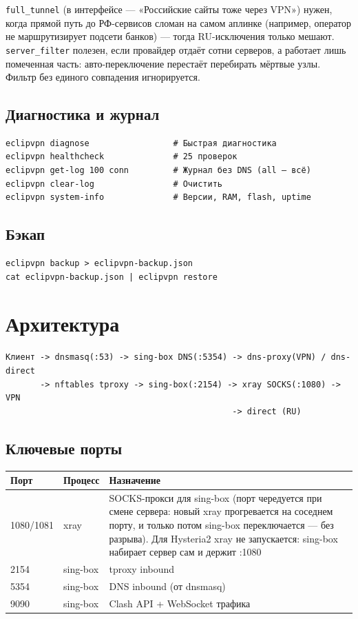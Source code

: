 \documentclass[11pt,a4paper]{article}
\begin{document}
\texttt{full\_tunnel} (в интерфейсе --- «Российские сайты тоже через VPN») нужен, когда прямой путь до РФ-сервисов сломан на самом аплинке (например, оператор не маршрутизирует подсети банков) --- тогда RU-исключения только мешают. \texttt{server\_filter} полезен, если провайдер отдаёт сотни серверов, а работает лишь помеченная часть: авто-переключение перестаёт перебирать мёртвые узлы. Фильтр без единого совпадения игнорируется.

\subsection{Диагностика и журнал}

\begin{lstlisting}
eclipvpn diagnose                 # Быстрая диагностика
eclipvpn healthcheck              # 25 проверок
eclipvpn get-log 100 conn         # Журнал без DNS (all — всё)
eclipvpn clear-log                # Очистить
eclipvpn system-info              # Версии, RAM, flash, uptime
\end{lstlisting}

\subsection{Бэкап}

\begin{lstlisting}
eclipvpn backup > eclipvpn-backup.json
cat eclipvpn-backup.json | eclipvpn restore
\end{lstlisting}

\section{Архитектура}

\begin{lstlisting}
Клиент -> dnsmasq(:53) -> sing-box DNS(:5354) -> dns-proxy(VPN) / dns-direct
       -> nftables tproxy -> sing-box(:2154) -> xray SOCKS(:1080) -> VPN
                                              -> direct (RU)
\end{lstlisting}

\subsection{Ключевые порты}

\begin{tabularx}{\textwidth}{l l X}
\toprule
\textbf{Порт} & \textbf{Процесс} & \textbf{Назначение} \\
\midrule
1080/1081 & xray & SOCKS-прокси для sing-box (порт чередуется при смене сервера: новый xray прогревается на соседнем порту, и только потом sing-box переключается --- без разрыва). Для Hysteria2 xray не запускается: sing-box набирает сервер сам и держит :1080 \\
2154 & sing-box & tproxy inbound \\
5354 & sing-box & DNS inbound (от dnsmasq) \\
9090 & sing-box & Clash API + WebSocket трафика \\
\bottomrule
\end{tabularx}
\end{document}
